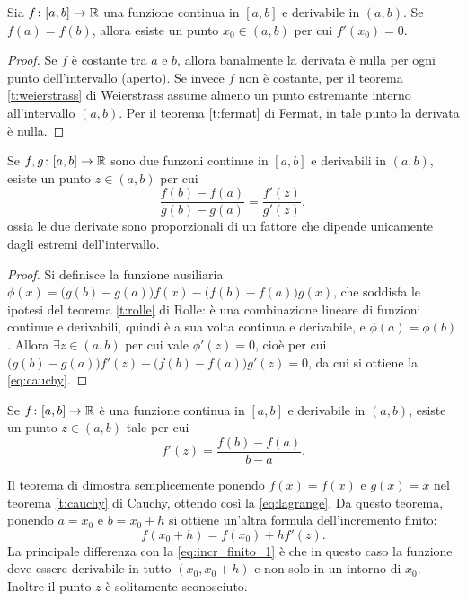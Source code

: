 \begin{teorema}[di Rolle]
\label{t:rolle}
Sia $f\colon [a,b]\to\mathbb{R}$ una funzione continua in $[a,b]$ e derivabile in $(a,b)$. Se $f(a)=f(b)$, allora esiste un punto $x_0\in (a,b)$ per cui $f'(x_0)=0$.
\end{teorema}
\begin{proof}
Se $f$ è costante tra $a$ e $b$, allora banalmente la derivata è nulla per ogni punto dell'intervallo (aperto).
Se invece $f$ non è costante, per il teorema \ref{t:weierstrass} di Weierstrass assume almeno un punto estremante interno all'intervallo $(a,b)$. Per il teorema \ref{t:fermat} di Fermat, in tale punto la derivata è nulla.
\end{proof}


\begin{teorema}[di Cauchy]
\label{t:cauchy}
Se $f,g\colon[a,b]\to\mathbb{R}$ sono due funzoni continue in $[a,b]$ e derivabili in $(a,b)$, esiste un punto $z\in(a,b)$ per cui
\begin{equation}
\label{eq:cauchy}
\frac{f(b)-f(a)}{g(b)-g(a)}=\frac{f'(z)}{g'(z)},
\end{equation}
ossia le due derivate sono proporzionali di un fattore che dipende unicamente dagli estremi dell'intervallo.
\end{teorema}
\begin{proof}
Si definisce la funzione ausiliaria $\phi(x)=\big(g(b)-g(a)\big)f(x)-\big(f(b)-f(a)\big)g(x)$, che soddisfa le ipotesi del teorema \ref{t:rolle} di Rolle: è una combinazione lineare di funzioni continue e derivabili, quindi è a sua volta continua e derivabile, e $\phi(a)=\phi(b)$. Allora $\exists z\in(a,b)$ per cui vale $\phi'(z)=0$, cioè per cui $\big(g(b)-g(a)\big)f'(z)-\big(f(b)-f(a)\big)g'(z)=0$, da cui si ottiene la \eqref{eq:cauchy}.
\end{proof}
\begin{teorema}[di Lagrange]
\label{t:lagrange}
Se $f\colon[a,b]\to\mathbb{R}$ è una funzione continua in $[a,b]$ e derivabile in $(a,b)$, esiste un punto $z\in(a,b)$ tale per cui
\begin{equation}
\label{eq:lagrange}
f'(z)=\frac{f(b)-f(a)}{b-a}.
\end{equation}
\end{teorema}
Il teorema di dimostra semplicemente ponendo $f(x)=f(x)$ e $g(x)=x$ nel teorema \ref{t:cauchy} di Cauchy, ottendo così la \eqref{eq:lagrange}.
Da questo teorema, ponendo $a=x_0$ e $b=x_0+h$ si ottiene un'altra formula dell'incremento finito:
\begin{equation}
\label{eq:incr_finito_2}
f(x_0+h)=f(x_0)+hf'(z).
\end{equation}
La principale differenza con la \ref{eq:incr_finito_1} è che in questo caso la funzione deve essere derivabile in tutto $(x_0,x_0+h)$ e non solo in un intorno di $x_0$. Inoltre il punto $z$ è solitamente sconosciuto.

